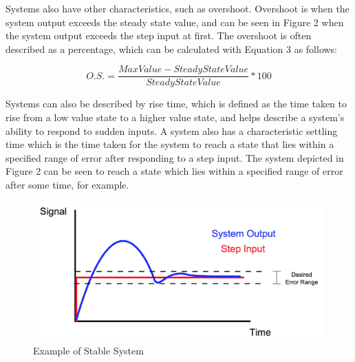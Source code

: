 \documentclass[12pt]{article}
\begin{document}
Systems also have other characteristics, such as overshoot. Overshoot is when the system output exceeds the steady state value, and can be seen in Figure 2 when the system output exceeds the step input at first. The overshoot is often described as a percentage, which can be calculated with Equation 3 as follows:
\bigskip

\begin{equation}
O.S. = \frac{Max Value - Steady State Value}{Steady State Value}*100
\end{equation}
\bigskip

Systems can also be described by rise time, which is defined as the time taken to rise from a low value state to a higher value state, and helps describe a system's ability to respond to sudden inputs. A system also has a characteristic settling time which is the time taken for the system to reach a state that lies within a specified range of error after responding to a step input. The system depicted in Figure 2 can be seen to reach a state which lies within a specified range of error after some time, for example.
\bigskip


\begin{figure}[h!] %
   \centering
   \includegraphics[width=\linewidth]{stable_system.JPG} 
   \caption{Example of Stable System}
   \label{fig:example}
\end{figure}

\bigskip

\end{document}
